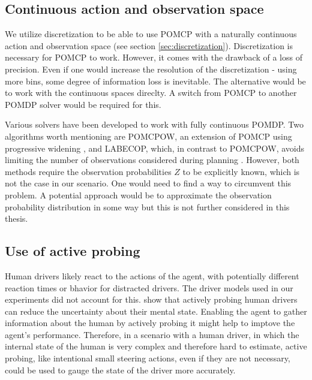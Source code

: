 \subsection{Continuous action and observation space}
\label{sec:conclusion-continuous}

We utilize discretization to be able to use POMCP with a naturally continuous action and observation space (see section \ref{sec:discretization}). Discretization is necessary for POMCP to work. However, it comes with the drawback of a loss of precision. Even if one would increase the resolution of the discretization - using more bins, some degree of information loss is inevitable. The alternative would be to work with the continuous spaces direclty. A switch from POMCP to another POMDP solver would be required for this.

Various solvers have been developed to work with fully continuous POMDP. Two algorithms worth mentioning are POMCPOW, an extension of POMCP using progressive widening \parencite{online_pomdp_cont}, and LABECOP, which, in contrast to POMCPOW, avoids limiting the number of observations considered during planning \parencite{online-cont-pomdp-2}. However, both methods require the observation probabilities $Z$ to be explicitly known, which is not the case in our scenario. One would need to find a way to circumvent this problem. A potential approach would be to approximate the observation probability distribution in some way but this is not further considered in this thesis.

\subsection{Use of active probing}

Human drivers likely react to the actions of the agent, with potentially different reaction times or bhavior for distracted drivers. The driver models used in our experiments did not account for this. \cite{att_intersec} show that actively probing human drivers can reduce the uncertainty about their mental state. Enabling the agent to gather information about the human by actively probing it might help to imptove the agent's performance. Therefore, in a scenario with a human driver, in which the internal state of the human is very complex and therefore hard to estimate, active probing, like intentional small steering actions, even if they are not necessary, could be used to gauge the state of the driver more accurately.


